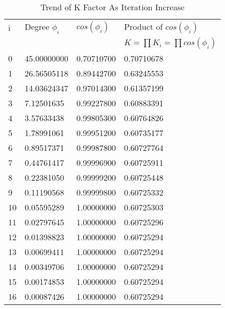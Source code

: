 \begin{table}[htbp]
  \centering
  \caption{Trend of K Factor As Iteration Increase}
    \begin{tabular}{|l|l|l|l|}
    \toprule
    i     & Degree $\phi_i$     & $cos(\phi_i)$     & Product of $cos(\phi_i)$ \\
         &      &      & $K=\prod K_i = \prod cos (\phi_i)$  \\
    \midrule
    0     & 45.00000000 & 0.70710700 & 0.70710678 \\
    1     & 26.56505118 & 0.89442700 & 0.63245553 \\
    2     & 14.03624347 & 0.97014300 & 0.61357199 \\
    3     & 7.12501635 & 0.99227800 & 0.60883391 \\
    4     & 3.57633438 & 0.99805300 & 0.60764826 \\
    5     & 1.78991061 & 0.99951200 & 0.60735177 \\
    6     & 0.89517371 & 0.99987800 & 0.60727764 \\
    7     & 0.44761417 & 0.99996900 & 0.60725911 \\
    8     & 0.22381050 & 0.99999200 & 0.60725448 \\
    9     & 0.11190568 & 0.99999800 & 0.60725332 \\
    10    & 0.05595289 & 1.00000000 & 0.60725303 \\
    11    & 0.02797645 & 1.00000000 & 0.60725296 \\
    12    & 0.01398823 & 1.00000000 & 0.60725294 \\
    13    & 0.00699411 & 1.00000000 & 0.60725294 \\
    14    & 0.00349706 & 1.00000000 & 0.60725294 \\
    15    & 0.00174853 & 1.00000000 & 0.60725294 \\
    16    & 0.00087426 & 1.00000000 & 0.60725294 \\
    \bottomrule
    \end{tabular}%
  \label{tab:Kfactor}%
\end{table}%
